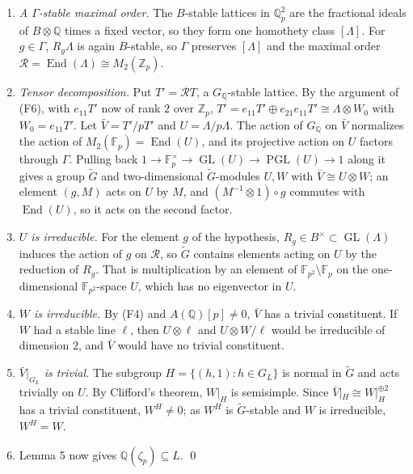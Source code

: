 \documentclass[11pt]{article}
\newcommand{\Q}{\mathbb Q}
\newcommand{\Z}{\mathbb Z}
\newcommand{\F}{\mathbb F}
\DeclareMathOperator{\End}{End}
\DeclareMathOperator{\GL}{GL}
\DeclareMathOperator{\PGL}{PGL}
\begin{document}
\begin{enumerate}
\item \emph{A \(\Gamma\)-stable maximal order.} The \(B\)-stable lattices in \(\Q_p^2\) are the fractional
          ideals of \(B\otimes\Q\) times a fixed vector, so they form one homothety class \([\Lambda]\). For
          \(g\in\Gamma\), \(R_g\Lambda\) is again \(B\)-stable, so \(\Gamma\) preserves \([\Lambda]\) and the maximal
          order \(\mathcal R=\End(\Lambda)\cong M_2(\Z_p)\).
\item \emph{Tensor decomposition.} Put \(T'=\mathcal R T\), a \(G_{\Q}\)-stable lattice. By the argument of (F6), with \(e_{11}T'\) now of rank \(2\) over \(\Z_p\), \(T'=e_{11}T'\oplus e_{21}e_{11}T'\cong\Lambda\otimes W_0\) with \(W_0=e_{11}T'\). Let \(\bar V=T'/pT'\) and \(U=\Lambda/p\Lambda\). The action of \(G_{\Q}\)
          on \(\bar V\) normalizes the action of \(M_2(\F_p)=\End(U)\), and its projective action on \(U\)
          factors through \(\Gamma\). Pulling back \(1\to\F_p^\times\to\GL(U)\to\PGL(U)\to1\) along it gives a
          group \(\tilde G\) and two-dimensional \(\tilde G\)-modules \(U,W\) with \(\bar V\cong U\otimes W\); an
          element \((g,M)\) acts on \(U\) by \(M\), and \((M^{-1}\otimes1)\circ g\) commutes with \(\End(U)\), so
          it acts on the second factor.
\item \emph{\(U\) is irreducible.} For the element \(g\) of the hypothesis, \(R_g\in B^\times\subset\GL(\Lambda)\)
          induces the action of \(g\) on \(\mathcal R\), so \(\tilde G\) contains elements acting on \(U\) by the
          reduction of \(R_g\). That is multiplication by an element of \(\F_{p^2}\setminus\F_p\) on the
          one-dimensional \(\F_{p^2}\)-space \(U\), which has no eigenvector in \(U\).
\item \emph{\(W\) is irreducible.} By (F4) and \(A(\Q)[p]\neq0\), \(\bar V\) has a trivial constituent. If
          \(W\) had a stable line \(\ell\), then \(U\otimes\ell\) and \(U\otimes W/\ell\) would be irreducible of
          dimension \(2\), and \(\bar V\) would have no trivial constituent.
\item \emph{\(\bar V|_{G_L}\) is trivial.} The subgroup \(H=\{(h,1):h\in G_L\}\) is normal in \(\tilde G\)
          and acts trivially on \(U\). By Clifford's theorem, \(W|_H\) is semisimple. Since
          \(\bar V|_H\cong W|_H^{\oplus2}\) has a trivial constituent, \(W^H\neq0\); as \(W^H\) is
          \(\tilde G\)-stable and \(W\) is irreducible, \(W^H=W\).
\item Lemma 5 now gives \(\Q(\zeta_p)\subseteq L\). \qed
\end{enumerate}
\end{document}
